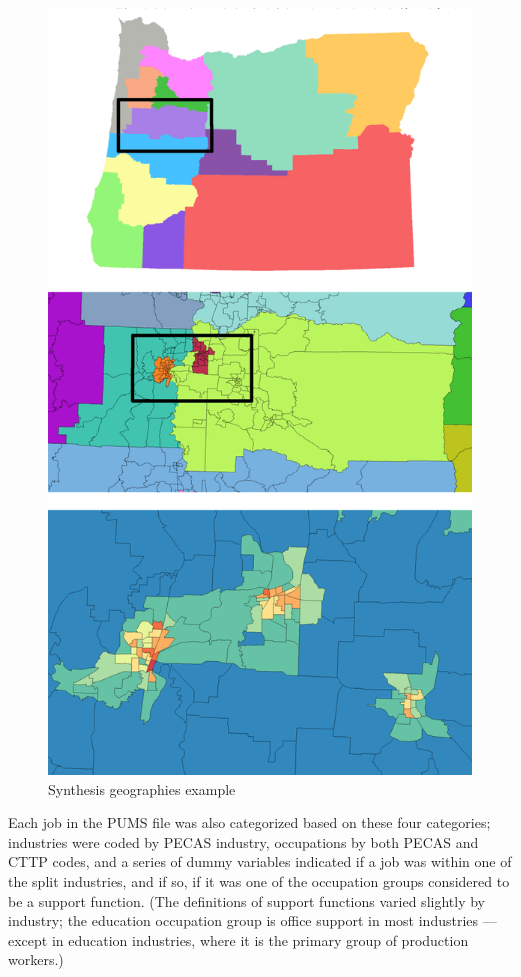 \begin{figure}   %
\centering
\includegraphics[scale=0.475]{aa/synthesis-geographies}
\caption{Synthesis geographies example}\label{fig:aa-synthesis-geographies}
\end{figure}

Each job in the PUMS file was also categorized based on these four categories; industries were coded by PECAS industry, occupations by both PECAS and CTTP codes, and a series of dummy variables indicated if a job was within one of the split industries, and if so, if it was one of the occupation groups considered to be a support function. (The definitions of support functions varied slightly by industry; the education occupation group is office support in most industries --- except in education industries, where it is the primary group of production workers.)

